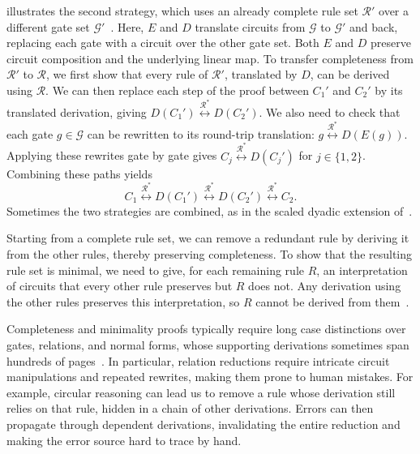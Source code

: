 \documentclass[acmsmall,nonacm,11pt,screen]{acmart}
\newcommand{\rewrites}[1]{\overset{#1^{*}}{\longleftrightarrow}}
\begin{document}
\vspace{-.2 cm}

 illustrates the second strategy, which uses an already complete rule set $\mathcal{R}'$ over a different gate set $\mathcal{G}'$~\cite{bian2023cliffordt2,bian2023cliffordcs3,clement2026realcliffordch,amy2024toffoli,blake2026simpler,clement2023complete,clement2024extensions,delorme2026control,schober2026control,blake2026qudit}. Here, $E$ and $D$ translate circuits from $\mathcal{G}$ to $\mathcal{G}'$ and back, replacing each gate with a circuit over the other gate set. Both $E$ and $D$ preserve circuit composition and the underlying linear map. To transfer completeness from $\mathcal{R}'$ to $\mathcal{R}$, we first show that every rule of $\mathcal{R}'$, translated by $D$, can be derived using $\mathcal{R}$. We can then replace each step of the proof between $C_1'$ and $C_2'$ by its translated derivation, giving $D(C_1')\rewrites{\mathcal{R}}D(C_2')$. We also need to check that each gate $g\in\mathcal{G}$ can be rewritten to its round-trip translation: $g\rewrites{\mathcal{R}}D(E(g))$. Applying these rewrites gate by gate gives $C_j\rewrites{\mathcal{R}}D(C_j')$ for $j\in\{1,2\}$. Combining these paths yields
\[
C_1\rewrites{\mathcal{R}}D(C_1')\rewrites{\mathcal{R}}D(C_2')\rewrites{\mathcal{R}}C_2.
\]
Sometimes the two strategies are combined, as in the scaled dyadic extension of~\cite{li2021on}.
 

Starting from a complete rule set, we can remove a redundant rule by deriving it from the other rules, thereby preserving completeness. To show that the resulting rule set is minimal, we need to give, for each remaining rule $R$, an interpretation of circuits that every other rule preserves but $R$ does not. Any derivation using the other rules preserves this interpretation, so $R$ cannot be derived from them~\cite{clement2024minimal,blake2026simpler}.

Completeness and minimality proofs typically require long case distinctions over gates, relations, and normal forms, whose supporting derivations sometimes span hundreds of pages~\cite{fang2026hadamard,li2025qutrit,clement2026realcliffordch}. In particular, relation reductions require intricate circuit manipulations and repeated rewrites, making them prone to human mistakes. For example, circular reasoning can lead us to remove a rule whose derivation still relies on that rule, hidden in a chain of other derivations. Errors can then propagate through dependent derivations, invalidating the entire reduction and making the error source hard to trace by hand. 
\end{document}
